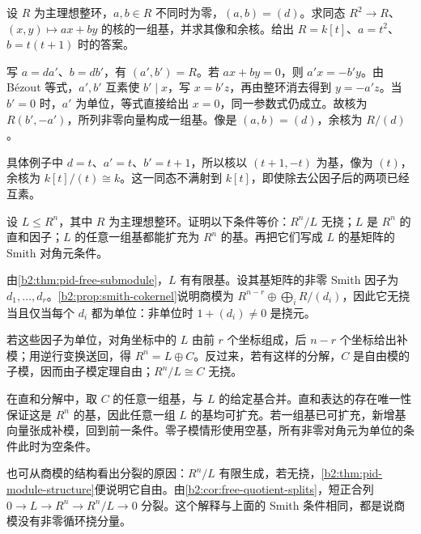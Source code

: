 \begin{exercise}\label{b2:ex:04-two-coordinate-kernel}
	设 \(R\) 为主理想整环，\(a,b\in R\) 不同时为零，\((a,b)=(d)\)。求同态 \(R^2\to R\)、\((x,y)\mapsto ax+by\) 的核的一组基，并求其像和余核。给出 \(R=k[t]\)、\(a=t^2\)、\(b=t(t+1)\) 时的答案。
\end{exercise}
\begin{solution}
	写 \(a=da'\)、\(b=db'\)，有 \((a',b')=R\)。若 \(ax+by=0\)，则 \(a'x=-b'y\)。由 Bézout 等式，\(a',b'\) 互素使 \(b'\mid x\)，写 \(x=b'z\)，再由整环消去得到 \(y=-a'z\)。当 \(b'=0\) 时，\(a'\) 为单位，等式直接给出 \(x=0\)，同一参数式仍成立。故核为 \(R(b',-a')\)，所列非零向量构成一组基。像是 \((a,b)=(d)\)，余核为 \(R/(d)\)。

	具体例子中 \(d=t\)、\(a'=t\)、\(b'=t+1\)，所以核以 \((t+1,-t)\) 为基，像为 \((t)\)，余核为 \(k[t]/(t)\cong k\)。这一同态不满射到 \(k[t]\)，即使除去公因子后的两项已经互素。
\end{solution}

\begin{exercise}\label{b2:ex:04-primitive-submodule}
	设 \(L\le R^n\)，其中 \(R\) 为主理想整环。证明以下条件等价：\(R^n/L\) 无挠；\(L\) 是 \(R^n\) 的直和因子；\(L\) 的任意一组基都能扩充为 \(R^n\) 的基。再把它们写成 \(L\) 的基矩阵的 Smith 对角元条件。
\end{exercise}
\begin{solution}
	由\cref{b2:thm:pid-free-submodule}，\(L\) 有有限基。设其基矩阵的非零 Smith 因子为 \(d_1,\ldots,d_r\)。\cref{b2:prop:smith-cokernel}说明商模为 \(R^{n-r}\oplus\bigoplus_iR/(d_i)\)，因此它无挠当且仅当每个 \(d_i\) 都为单位：非单位时 \(1+(d_i)\ne0\) 是挠元。

	若这些因子为单位，对角坐标中的 \(L\) 由前 \(r\) 个坐标组成，后 \(n-r\) 个坐标给出补模；用逆行变换送回，得 \(R^n=L\oplus C\)。反过来，若有这样的分解，\(C\) 是自由模的子模，因而由子模定理自由；\(R^n/L\cong C\) 无挠。

	在直和分解中，取 \(C\) 的任意一组基，与 \(L\) 的给定基合并。直和表达的存在唯一性保证这是 \(R^n\) 的基，因此任意一组 \(L\) 的基均可扩充。若一组基已可扩充，新增基向量张成补模，回到前一条件。零子模情形使用空基，所有非零对角元为单位的条件此时为空条件。

	也可从商模的结构看出分裂的原因：\(R^n/L\) 有限生成，若无挠，\cref{b2:thm:pid-module-structure}便说明它自由。由\cref{b2:cor:free-quotient-splits}，短正合列 \(0\to L\to R^n\to R^n/L\to0\) 分裂。这个解释与上面的 Smith 条件相同，都是说商模没有非零循环挠分量。
\end{solution}

